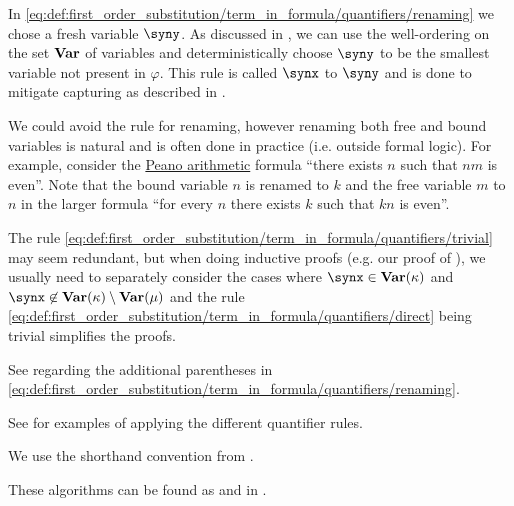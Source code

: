 \begin{comments}
  \item In \eqref{eq:def:first_order_substitution/term_in_formula/quantifiers/renaming} we chose a fresh variable \( \syny \). As discussed in , we can use the well-ordering on the set \( \op*{Var} \) of variables and deterministically choose \( \syny \) to be the smallest variable not present in \( \varphi \). This rule is called  \( \synx \) to \( \syny \) and is done to mitigate capturing as described in .

  \item We could avoid the rule for renaming, however renaming both free and bound variables is natural and is often done in practice (i.e. outside formal logic). For example, consider the \hyperref[def:peano_arithmetic]{Peano arithmetic} formula \enquote{there exists \( n \) such that \( nm \) is even}. Note that the bound variable \( n \) is renamed to \( k \) and the free variable \( m \) to \( n \) in the larger formula \enquote{for every \( n \) there exists \( k \) such that \( kn \) is even}.

  \item The rule \eqref{eq:def:first_order_substitution/term_in_formula/quantifiers/trivial} may seem redundant, but when doing inductive proofs (e.g. our proof of ), we usually need to separately consider the cases where \( \synx \in \op*{Var}(\kappa) \) and \( \synx \not\in \op*{Var}(\kappa) \setminus \op*{Var}(\mu) \) and the rule \eqref{eq:def:first_order_substitution/term_in_formula/quantifiers/direct} being trivial simplifies the proofs.

  \item See  regarding the additional parentheses in \eqref{eq:def:first_order_substitution/term_in_formula/quantifiers/renaming}.

  \item See  for examples of applying the different quantifier rules.

  \item We use the shorthand convention from .

  \item These algorithms can be found as  and  in \cite{notebook:code}.
\end{comments}

